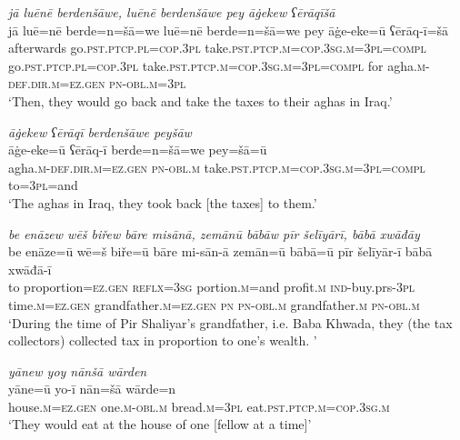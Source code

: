 \ea \label{BP.27}
\textit{jā luēnē berdenšāwe, luēnē berdenšāwe pey āġekew ʕērāqīšā} \\ 
\gll jā luē=nē berde=n=šā=we luē=nē berde=n=šā=we pey āġe-eke=ū ʕērāq-ī=šā \\ 
 afterwards go\textsc{.pst}\textsc{.ptcp}\textsc{.pl}\textsc{=cop}\textsc{.3pl} take\textsc{.pst}\textsc{.ptcp}\textsc{.m}\textsc{=cop}\textsc{.3sg}\textsc{.m}\textsc{=3pl}\textsc{=compl} go\textsc{.pst}\textsc{.ptcp}\textsc{.pl}\textsc{=cop}\textsc{.3pl} take\textsc{.pst}\textsc{.ptcp}\textsc{.m}\textsc{=cop}\textsc{.3sg}\textsc{.m}\textsc{=3pl}\textsc{=compl} for agha\textsc{.m}\textsc{-def}\textsc{.dir}\textsc{.m}\textsc{=ez.gen} \textsc{pn}\textsc{-obl}\textsc{.m}\textsc{=3pl} \\ 
\glt `Then, they would go back and take the taxes to their aghas in Iraq.'
\z 
 
\ea \label{BP.28}
\textit{āġekew ʕērāqī berdenšāwe peyšāw} \\ 
\gll āġe-eke=ū ʕērāq-ī berde=n=šā=we pey=šā=ū \\ 
 agha\textsc{.m}\textsc{-def}\textsc{.dir}\textsc{.m}\textsc{=ez.gen} \textsc{pn}\textsc{-obl}\textsc{.m} take\textsc{.pst}\textsc{.ptcp}\textsc{.m}\textsc{=cop}\textsc{.3sg}\textsc{.m}\textsc{=3pl}\textsc{=compl} to\textsc{=3pl}=and \\ 
\glt `The aghas in Iraq, they took back [the taxes] to them.'
\z 
 
\ea \label{BP.31}
\textit{be enāzew wēš biřew bāre misānā, zemānū bābāw pīr šelīyārī, bābā xwāđāy} \\ 
\gll be enāze=ū wē=š biře=ū bāre mi-sān-ā zemān=ū bābā=ū pīr šelīyār-ī bābā xwāđā-ī \\ 
 to proportion\textsc{=ez.gen} \textsc{reflx}\textsc{=3sg} portion\textsc{.m}=and profit\textsc{.m} \textsc{ind-}buy.prs\textsc{-3pl} time\textsc{.m}\textsc{=ez.gen} grandfather\textsc{.m}\textsc{=ez.gen} \textsc{pn} \textsc{pn}\textsc{-obl}\textsc{.m} grandfather\textsc{.m} \textsc{pn}\textsc{-obl}\textsc{.m} \\ 
\glt `During the time of Pir Shaliyar’s grandfather, i.e. Baba Khwada, they (the tax collectors) collected tax in proportion to one’s wealth. '
\z 
 
\ea \label{BP.39}
\textit{yānew yoy nānšā wārden} \\ 
\gll yāne=ū yo-ī nān=šā wārde=n \\ 
 house\textsc{.m}\textsc{=ez.gen} one\textsc{.m}\textsc{-obl}\textsc{.m} bread\textsc{.m}\textsc{=3pl} eat\textsc{.pst}\textsc{.ptcp}\textsc{.m}\textsc{=cop}\textsc{.3sg}\textsc{.m} \\ 
\glt `They would eat at the house of one [fellow at a time]'
\z 
 
